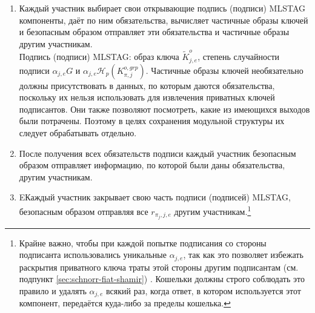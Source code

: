 \begin{enumerate}
\begin{enumerate}
        Инициатор безопасным образом отправляет всю эту информацию другим участ\-никам.\footnote{От него не требуется отправлять суммы в выходах $b_t$ напрямую, так как они могут быть вычислены на основе $\mathit{amount}_t$. Monero использует разумный подход к созданию частичной транзакции, заполненной информацией, выбранной инициатором, и к её отправке другим подписантам вместе со списком соответствующей информации, такой как приватные ключи транзакции, адреса назначения, реальные входы и т. д.} Другие участники могут сообщить ему о своём согласии, отправив свою часть данных для следующего раунда, или же могут согласовывать изменения.
        \item Каждый участник выбирает свои открывающие подпись (подписи) MLSTAG компо\-ненты, даёт по ним обязательства, вычисляет частичные образы ключей и безопас\-ным образом отправляет эти обязательства и частичные образы другим участникам.\\

        Подпись (подписи) MLSTAG: образ ключа $\tilde{K}^{o}_{j,e}$, степень случайности подписи $\alpha_{j,e} G$ и $\alpha_{j,e} \mathcal{H}_p(K^{o,grp}_{\pi,j})$. Частичные образы ключей необязательно должны присутствовать в данных, по которым даются обязательства, поскольку их нельзя использовать для извлечения приватных ключей подписантов. Они также позволяют посмотреть, какие из имеющихся выходов были потрачены. Поэтому в целях сохранения мо\-дульной структуры их следует обрабатывать отдельно.%
        \item После получения всех обязательств подписи каждый участник безопасным образом отправляет информацию, по которой были даны обязательства, другим участникам.
        \item EКаждый участник закрывает свою часть подписи (подписей) MLSTAG, безопас\-ным образом отправляя все $r_{{\pi_j},j,e}$ другим участникам.\footnote{Крайне важно, чтобы при каждой попытке подписания со стороны подписанта использовались уникальные $\alpha_{j,e}$, так как это позволяет избежать раскрытия приватного ключа траты этой стороны другим подписантам (см. подпункт \ref{sec:schnorr-fiat-shamir}) \cite{MRL-0009-multisig}. Кошельки должны строго соблюдать это правило и удалять $\alpha_{j,e}$ всякий раз, когда ответ, в котором используется этот компонент, передаётся куда-либо за пределы кошелька.}
    \end{enumerate}
\end{enumerate}

